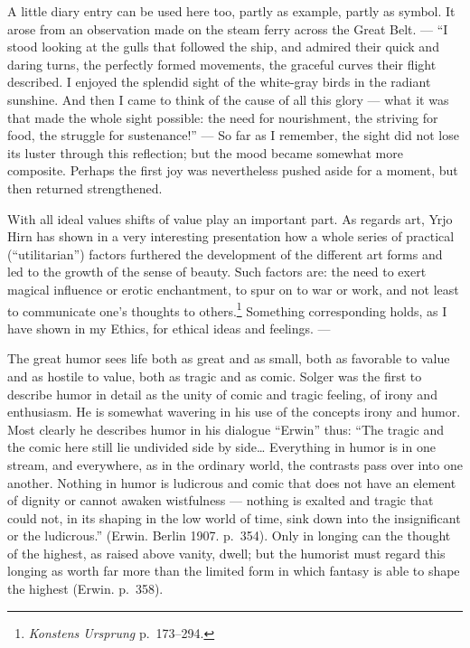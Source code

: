 \documentclass[12pt]{book}
\newcommand{\opage}[1]{\marginnote{\footnotesize\textit{[#1]}}}
\begin{document}
A little diary entry can be used here too, partly as example, partly as symbol. It
arose from an observation made on the steam ferry across the Great Belt. --- ``I
stood looking at the gulls that followed the ship, and admired their quick and
\opage{73}daring turns, the perfectly formed movements, the graceful curves their
flight described. I enjoyed the splendid sight of the white-gray birds in the
radiant sunshine. And then I came to think of the cause of all this glory --- what
it was that made the whole sight possible: the need for nourishment, the striving
for food, the struggle for sustenance!'' --- So far as I remember, the sight did not
lose its luster through this reflection; but the mood became somewhat more composite.
Perhaps the first joy was nevertheless pushed aside for a moment, but then returned
strengthened.

With all ideal values shifts of value play an important part. As regards art, Yrjo
Hirn has shown in a very interesting presentation how a whole series of practical
(``utilitarian'') factors furthered the development of the different art forms and
led to the growth of the sense of beauty. Such factors are: the need to exert magical
influence or erotic enchantment, to spur on to war or work, and not least to
communicate one's thoughts to others.\footnote{\textit{Konstens Ursprung}
p.~173--294.} Something corresponding holds, as I have shown in my Ethics, for
ethical ideas and feelings. ---

The great humor sees life both as great and as small, both as favorable to value and
as hostile to value, both as tragic and as comic. Solger was the first to describe
humor in detail as the unity of comic and tragic feeling, of irony and enthusiasm. He
is somewhat wavering in his use of the concepts irony and humor. Most clearly he
describes humor in his dialogue ``Erwin'' thus: ``The tragic and the comic here still
lie undivided side by side\dots{} Everything in humor is in one stream, and
everywhere, as in the ordinary world, the contrasts pass over into one another.
Nothing in humor is ludicrous and comic that does not have an element of dignity or
cannot awaken wistfulness --- nothing is exalted and tragic that could not, in its
shaping in the low world of time, sink down into the insignificant or the
ludicrous.'' (Erwin. Berlin 1907. p.~354). Only in longing can the thought of the
highest, as raised above vanity, dwell; but the humorist must regard this
\opage{74}longing as worth far more than the limited form in which fantasy is able to
shape the highest (Erwin. p.~358).
\end{document}
